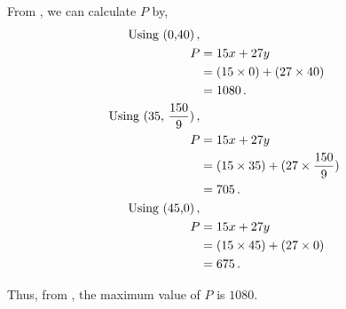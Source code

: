 \begin{subquestions}

\subquestion

From , we can calculate $P$ by,
\begin{align}
	\text{Using (0,40)} \,, \nonumber \\
	P & = 15x + 27y \nonumber \\
	  & = (15 \times 0) + (27 \times 40)  \nonumber \\
	  & = 1080 \,. \label{2008:q1:eqn:Profit} \\
	\text{Using (35, $\frac{150}{9})$} \,, \nonumber \\
	P & = 15x + 27y  \nonumber \\
	  & = (15 \times 35) + (27 \times \frac{150}{9})  \nonumber \\
	  & = 705 \,.    \\		  
	\text{Using (45,0)} \,, \nonumber \\
	P & = 15x + 27y \nonumber \\
	  & = (15 \times 45) + (27 \times 0)  \nonumber \\
	  & = 675 \,. 
\end{align}

Thus, from , the maximum value of $P$ is $1080$.

\end{subquestions}

